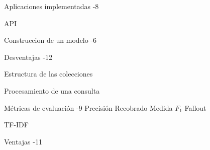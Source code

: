 \begin{theindex}

\item Aplicaciones implementadas -8
\item API 
\item Construccion de un modelo -6
\item Desventajas -12
\item Estructura de las colecciones 
\item Procesamiento de una consulta 
\item Métricas de evaluación -9
\subitem Precisión  
\subitem Recobrado 
\subitem Medida $F_1$ 
\subitem Fallout 
\item TF-IDF 
\item Ventajas -11

\end{theindex}
